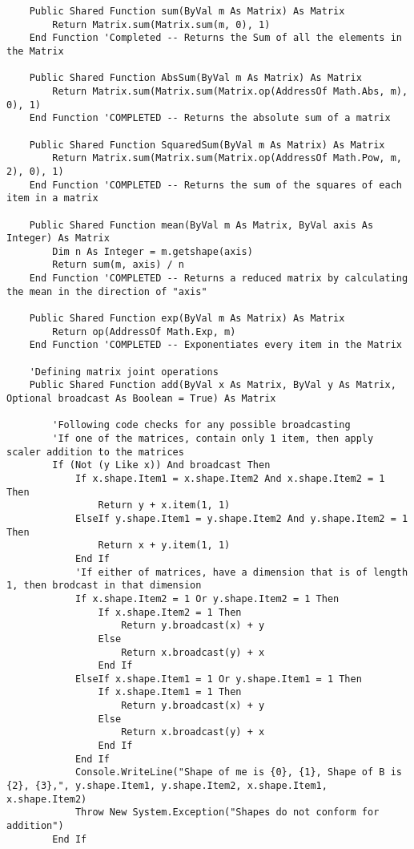 \begin{verbatim}
    Public Shared Function sum(ByVal m As Matrix) As Matrix
        Return Matrix.sum(Matrix.sum(m, 0), 1)
    End Function 'Completed -- Returns the Sum of all the elements in the Matrix

    Public Shared Function AbsSum(ByVal m As Matrix) As Matrix
        Return Matrix.sum(Matrix.sum(Matrix.op(AddressOf Math.Abs, m), 0), 1)
    End Function 'COMPLETED -- Returns the absolute sum of a matrix

    Public Shared Function SquaredSum(ByVal m As Matrix) As Matrix
        Return Matrix.sum(Matrix.sum(Matrix.op(AddressOf Math.Pow, m, 2), 0), 1)
    End Function 'COMPLETED -- Returns the sum of the squares of each item in a matrix

    Public Shared Function mean(ByVal m As Matrix, ByVal axis As Integer) As Matrix
        Dim n As Integer = m.getshape(axis)
        Return sum(m, axis) / n
    End Function 'COMPLETED -- Returns a reduced matrix by calculating the mean in the direction of "axis"

    Public Shared Function exp(ByVal m As Matrix) As Matrix
        Return op(AddressOf Math.Exp, m)
    End Function 'COMPLETED -- Exponentiates every item in the Matrix

    'Defining matrix joint operations
    Public Shared Function add(ByVal x As Matrix, ByVal y As Matrix, Optional broadcast As Boolean = True) As Matrix

        'Following code checks for any possible broadcasting
        'If one of the matrices, contain only 1 item, then apply scaler addition to the matrices
        If (Not (y Like x)) And broadcast Then
            If x.shape.Item1 = x.shape.Item2 And x.shape.Item2 = 1 Then
                Return y + x.item(1, 1)
            ElseIf y.shape.Item1 = y.shape.Item2 And y.shape.Item2 = 1 Then
                Return x + y.item(1, 1)
            End If
            'If either of matrices, have a dimension that is of length 1, then brodcast in that dimension
            If x.shape.Item2 = 1 Or y.shape.Item2 = 1 Then
                If x.shape.Item2 = 1 Then
                    Return y.broadcast(x) + y
                Else
                    Return x.broadcast(y) + x
                End If
            ElseIf x.shape.Item1 = 1 Or y.shape.Item1 = 1 Then
                If x.shape.Item1 = 1 Then
                    Return y.broadcast(x) + y
                Else
                    Return x.broadcast(y) + x
                End If
            End If
            Console.WriteLine("Shape of me is {0}, {1}, Shape of B is {2}, {3},", y.shape.Item1, y.shape.Item2, x.shape.Item1, x.shape.Item2)
            Throw New System.Exception("Shapes do not conform for addition")
        End If


\end{verbatim}
